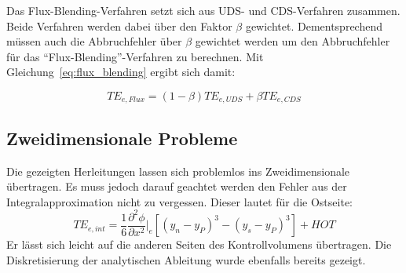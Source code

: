 Das Flux-Blending-Verfahren setzt sich aus UDS- und CDS-Verfahren zusammen. Beide
Verfahren werden dabei über den Faktor $\beta$ gewichtet. Dementsprechend müssen auch die
Abbruchfehler über $\beta$ gewichtet werden um den Abbruchfehler für das ``Flux-Blending''-Verfahren zu berechnen.
Mit Gleichung~\ref{eq:flux_blending} ergibt sich damit:

\begin{equation}
  TE_{e, Flux} = (1-\beta) TE_{e, UDS} + \beta TE_{e, CDS}
\end{equation}







\subsection{Zweidimensionale Probleme}
Die gezeigten Herleitungen lassen sich problemlos ins Zweidimensionale übertragen. Es muss
jedoch darauf geachtet werden den Fehler aus der Integralapproximation nicht zu vergessen.
Dieser lautet für die Ostseite:
\begin{equation}
  TE_{e,int} = \frac{1}{6} \frac{\partial^2\phi}{\partial x^2}\bigg\vert_e
    \left[{{(y_n-y_P)}^3-{(y_s-y_P)}^3}\right] + HOT
\end{equation}
Er lässt sich leicht auf die anderen Seiten des Kontrollvolumens übertragen. Die Diskretisierung
der analytischen Ableitung wurde ebenfalls bereits gezeigt.
\clearpage
